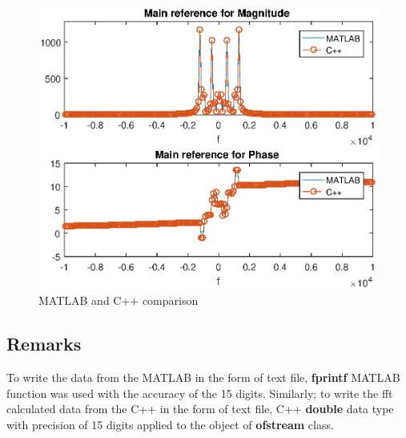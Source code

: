 \begin{figure}[h]
	\centering
	\includegraphics[width=12cm]{./algorithms/fft/figures/mixed_signal_fft.eps}
	\caption{MATLAB and C++ comparison}\label{mixed_signal_fft}
\end{figure}

\subsection{Remarks}
To write the data from the MATLAB in the form of text file, \textbf{fprintf} MATLAB function was used with the accuracy of the 15 digits. Similarly; to write the fft calculated data from the C++ in the form of text file, C++ \textbf{double} data type with precision of 15 digits applied to the object of \textbf{ofstream} class.\\



\newpage

\renewcommand{\bibname}{References}
%
%
%
%
%

\cleardoublepage


